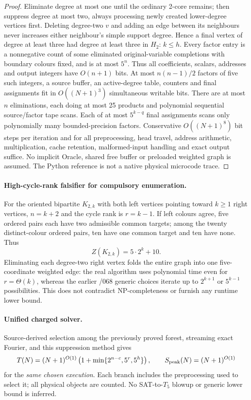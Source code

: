 \documentclass[11pt]{article}
\begin{document}
\begin{proof}
Eliminate degree at most one until the ordinary 2-core remains;
then suppress degree at most two, always processing newly
created lower-degree vertices first. Deleting degree-two $v$
and adding an edge between its neighbours never increases either
neighbour's simple support degree. Hence a final vertex of
degree at least three had degree at least three in $H_2$:
$k\le h$. Every factor entry is a nonnegative count of some
eliminated original-variable completions with boundary colours
fixed, and is at most $5^n$. Thus all coefficients, scalars,
addresses and output integers have $O(n+1)$ bits.
At most $n(n-1)/2$ factors of five such integers, a source
buffer, an active-degree table, counters and final assignments
fit in $O((N+1)^3)$ simultaneous writable bits.
There are at most $n$ eliminations, each doing at most 25
products and polynomial sequential source/factor tape scans.
Each of at most $5^{k-q}$ final assignments scans only
polynomially many bounded-precision factors. Conservative
$O((N+1)^8)$ bit steps per iteration and for all preprocessing,
head travel, address arithmetic, multiplication, cache retention,
malformed-input handling and exact output suffice.
No implicit Oracle, shared free buffer or preloaded weighted
graph is assumed. The Python reference is not a native physical
microcode trace.
\end{proof}

\paragraph{High-cycle-rank falsifier for compulsory enumeration.}
For the oriented bipartite $K_{2,k}$ with both left vertices
pointing toward $k\ge1$ right vertices, $n=k+2$ and the cycle
rank is $r=k-1$. If left colours agree, five ordered pairs
each have two admissible common targets; among the twenty
distinct-colour ordered pairs, ten have one common target
and ten have none. Thus
\[
 \boxed{Z(K_{2,k})=5\cdot 2^k+10.}
\]
Eliminating each degree-two right vertex folds the entire
graph into one five-coordinate weighted edge: the real
algorithm uses polynomial time even for $r=\Theta(k)$, whereas
the earlier /068 generic choices iterate up to
$2^{k+1}$ or $5^{k-1}$ possibilities. This does not contradict
NP-completeness or furnish any runtime lower bound.

\paragraph{Unified charged solver.}
Source-derived selection among the previously proved forest,
streaming exact Fourier, and this suppression method gives
\[
 T(N)=(N+1)^{O(1)}
 \left(1+\min\{2^{n-c},5^r,5^h\}\right),\qquad
 S_{\rm peak}(N)=(N+1)^{O(1)}
\]
for the \emph{same chosen execution}. Each branch includes the
preprocessing used to select it; all physical objects are counted.
No SAT-to-$T_5$ blowup or generic lower bound is inferred.
\end{document}
